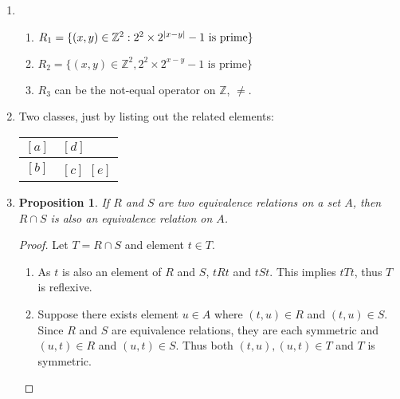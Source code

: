 \documentclass{homework}
\newtheorem*{prop}{Proposition}
\begin{document}
\begin{enumerate}
\begin{minipage}[t]{\linewidth}
\begin{proof}
\begin{enumerate}
					\item \underline{Symmetric}. For $(x, y) \in \mathbb{R}^2$, as $x - y \in \mathbb{Z}$, then $y - x = -(x - y) \in \mathbb{Z}$ too.
					
					\item \underline{Transitive}. For $(x, y), (y, z) \in \mathbb{R}^2$, subtracting the two relations from another, \begin{align*}
						x - y & \in \mathbb{Z} \\
						y - z & \in \mathbb{Z}
					\end{align*}
					Then $x - z  \in \mathbb{Z}$ as subtraction is closed for integers, therefore $(x, z) \in R$.
				\end{enumerate}
			\end{proof}
		\end{minipage}
	
		\item \begin{enumerate}
			\item $R_1 = \{ (x, y) \in \mathbb{Z}^2 : 2^2 \times 2^{\abs{x-y}} - 1 \text{ is prime} \}$
			\item $R_2 = \{ (x, y) \in \mathbb{Z}^2, 2^2 \times 2^{x - y} - 1 \text{ is prime} \}$
			\item $R_3$ can be the not-equal operator on $\mathbb{Z}$, $\ne$.
		\end{enumerate}
		
		\item Two classes, just by listing out the related elements: \begin{tabular}{c|l}
			$[a]$ & $[d]$ \\ \midrule
			$[b]$ & $[c]$ $[e]$
		\end{tabular}
	
		\item \begin{minipage}[t]{\linewidth}
			\begin{prop}
				If $R$ and $S$ are two equivalence relations on a set $A$, then $R \cap S$ is also an equivalence relation on $A$.
			\end{prop}
			\begin{proof} Let $T = R \cap S$ and element $t \in T$.
				
				\begin{enumerate}
					\item As $t$ is also an element of $R$ and $S$, $t R t$ and $t S t$. This implies $t T t$, thus $T$ is reflexive.
					\item Suppose there exists element $u \in A$ where $(t, u) \in R$ and $(t, u) \in S$. Since $R$ and $S$ are equivalence relations, they are each symmetric and $(u, t) \in R$ and $(u, t) \in S$. Thus both $(t, u), (u, t) \in T$ and $T$ is symmetric.
					

\end{enumerate}
\end{proof}
\end{minipage}
\end{enumerate}
\end{document}
